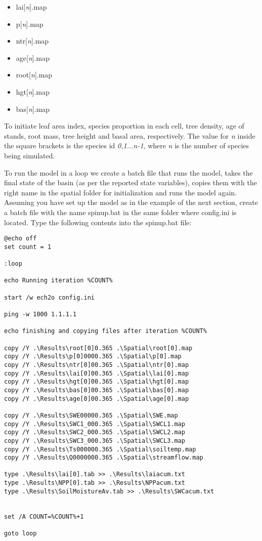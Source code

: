 \begin{itemize}

\item lai[\textit{n}].map
\item p[\textit{n}].map
\item ntr[\textit{n}].map
\item age[\textit{n}].map
\item root[\textit{n}].map
\item hgt[\textit{n}].map
\item bas[\textit{n}].map

\end{itemize}

To initiate leaf area index, species proportion in each cell, tree density, age of stands, root mass, tree height and basal area, respectively. The value for \textsf{\textit{n}} inside the square brackets is the species id \textsf{\textit{0,1...n-1}}, where \textsf{\textit{n}} is the number of species being simulated.     

To run the model in a loop we create a batch file that runs the model, takes the final state of the basin (as per the reported state variables), copies them with the right name in the spatial folder for initialization and runs the model again. Assuming you have set up the model as in the example of the next section, create a batch file with the name \textsf{spinup.bat} in the same folder where \textsf{config.ini} is located. Type the following contents into the \textsf{spinup.bat} file: 

\begin{verbatim}
@echo off
set count = 1

:loop

echo Running iteration %COUNT%

start /w ech2o config.ini

ping -w 1000 1.1.1.1 

echo finishing and copying files after iteration %COUNT%

copy /Y .\Results\root[0]0.365 .\Spatial\root[0].map
copy /Y .\Results\p[0]0000.365 .\Spatial\p[0].map
copy /Y .\Results\ntr[0]00.365 .\Spatial\ntr[0].map
copy /Y .\Results\lai[0]00.365 .\Spatial\lai[0].map
copy /Y .\Results\hgt[0]00.365 .\Spatial\hgt[0].map
copy /Y .\Results\bas[0]00.365 .\Spatial\bas[0].map
copy /Y .\Results\age[0]00.365 .\Spatial\age[0].map

copy /Y .\Results\SWE00000.365 .\Spatial\SWE.map
copy /Y .\Results\SWC1_000.365 .\Spatial\SWCL1.map
copy /Y .\Results\SWC2_000.365 .\Spatial\SWCL2.map
copy /Y .\Results\SWC3_000.365 .\Spatial\SWCL3.map
copy /Y .\Results\Ts000000.365 .\Spatial\soiltemp.map
copy /Y .\Results\Q0000000.365 .\Spatial\streamflow.map

type .\Results\lai[0].tab >> .\Results\laiacum.txt
type .\Results\NPP[0].tab >> .\Results\NPPacum.txt
type .\Results\SoilMoistureAv.tab >> .\Results\SWCacum.txt


set /A COUNT=%COUNT%+1

goto loop 

\end{verbatim}

